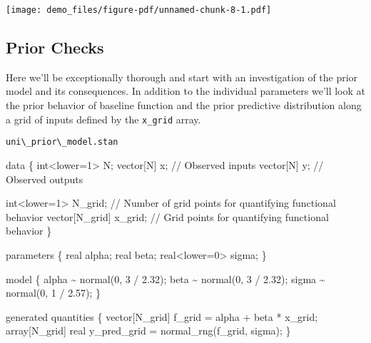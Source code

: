 \documentclass[
  letterpaper,
  DIV=11,
  numbers=noendperiod]{scrartcl}
\newenvironment{Shaded}{\begin{snugshade}}{\end{snugshade}}
\newcommand{\CommentTok}[1]{\textcolor[rgb]{0.37,0.37,0.37}{#1}}
\newcommand{\DataTypeTok}[1]{\textcolor[rgb]{0.68,0.00,0.00}{#1}}
\newcommand{\DecValTok}[1]{\textcolor[rgb]{0.68,0.00,0.00}{#1}}
\newcommand{\FloatTok}[1]{\textcolor[rgb]{0.68,0.00,0.00}{#1}}
\newcommand{\KeywordTok}[1]{\textcolor[rgb]{0.00,0.23,0.31}{#1}}
\newcommand{\NormalTok}[1]{\textcolor[rgb]{0.00,0.23,0.31}{#1}}
\begin{document}
\texttt{[image: demo\_files/figure-pdf/unnamed-chunk-8-1.pdf]}

\subsection{Prior Checks}\label{prior-checks}

Here we'll be exceptionally thorough and start with an investigation of
the prior model and its consequences. In addition to the individual
parameters we'll look at the prior behavior of baseline function and the
prior predictive distribution along a grid of inputs defined by the
\texttt{x\_grid} array.

\begin{codelisting}

\caption{\texttt{uni\textbackslash\_prior\textbackslash\_model.stan}}

\begin{Shaded}
\begin{Highlighting}[]
\KeywordTok{data}\NormalTok{ \{}
  \DataTypeTok{int}\NormalTok{\textless{}}\KeywordTok{lower}\NormalTok{=}\DecValTok{1}\NormalTok{\textgreater{} N;}
  \DataTypeTok{vector}\NormalTok{[N] x; }\CommentTok{// Observed inputs}
  \DataTypeTok{vector}\NormalTok{[N] y; }\CommentTok{// Observed outputs}

  \DataTypeTok{int}\NormalTok{\textless{}}\KeywordTok{lower}\NormalTok{=}\DecValTok{1}\NormalTok{\textgreater{} N\_grid; }\CommentTok{// Number of grid points for quantifying functional behavior}
  \DataTypeTok{vector}\NormalTok{[N\_grid] x\_grid; }\CommentTok{// Grid points for quantifying functional behavior}
\NormalTok{\}}

\KeywordTok{parameters}\NormalTok{ \{}
  \DataTypeTok{real}\NormalTok{ alpha;}
  \DataTypeTok{real}\NormalTok{ beta;}
  \DataTypeTok{real}\NormalTok{\textless{}}\KeywordTok{lower}\NormalTok{=}\DecValTok{0}\NormalTok{\textgreater{} sigma;}
\NormalTok{\}}

\KeywordTok{model}\NormalTok{ \{}
\NormalTok{  alpha \textasciitilde{} normal(}\DecValTok{0}\NormalTok{, }\DecValTok{3}\NormalTok{ / }\FloatTok{2.32}\NormalTok{);}
\NormalTok{  beta \textasciitilde{} normal(}\DecValTok{0}\NormalTok{, }\DecValTok{3}\NormalTok{ / }\FloatTok{2.32}\NormalTok{);}
\NormalTok{  sigma \textasciitilde{} normal(}\DecValTok{0}\NormalTok{, }\DecValTok{1}\NormalTok{ / }\FloatTok{2.57}\NormalTok{);}
\NormalTok{\}}

\KeywordTok{generated quantities}\NormalTok{ \{}
  \DataTypeTok{vector}\NormalTok{[N\_grid] f\_grid = alpha + beta * x\_grid;}
  \DataTypeTok{array}\NormalTok{[N\_grid] }\DataTypeTok{real}\NormalTok{ y\_pred\_grid = normal\_rng(f\_grid, sigma);}
\NormalTok{\}}
\end{Highlighting}
\end{Shaded}

\end{codelisting}
\end{document}
